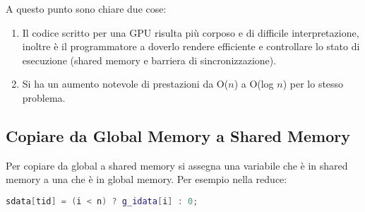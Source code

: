 \subsubsection{}

A questo punto sono chiare due cose: 

\begin{enumerate}
  \item Il codice scritto per una GPU risulta più corposo e di difficile interpretazione, inoltre è il programmatore a doverlo rendere efficiente e controllare lo stato di esecuzione (shared memory e barriera di sincronizzazione). 
  \item Si ha un aumento notevole di prestazioni da O($n$) a O(log $n$) per lo stesso problema.
\end{enumerate}

\subsection{Copiare da Global Memory a Shared Memory}

Per copiare da global a shared memory si assegna una variabile che è in shared memory a una che è in global memory. Per esempio nella reduce: 

\begin{lstlisting}[language=C++]
  sdata[tid] = (i < n) ? g_idata[i] : 0;
\end{lstlisting}





